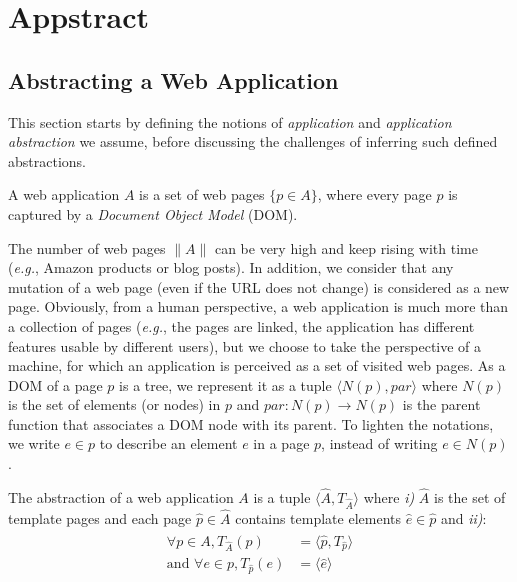 \section{Appstract}\label{appstract:sec:appstract}
\subsection{Abstracting a Web Application}
This section starts by defining the notions of \emph{application} and \emph{application abstraction} we assume, before discussing the challenges of inferring such defined abstractions.

\begin{defn}[\em Application]
A web application $A$ is a set of web pages $\{p \in A\}$, where every page $p$ is captured by a \emph{Document Object Model} (DOM).
\end{defn}

The number of web pages $\|A\|$ can be very high and keep rising with time (\emph{e.g.}, Amazon products or blog posts).
In addition, we consider that any mutation of a web page (even if the URL does not change) is considered as a new page.
Obviously, from a human perspective, a web application is much more than a collection of pages (\emph{e.g.}, the pages are linked, the application has different features usable by different users), but we choose to take the perspective of a machine, for which an application is perceived as a set of visited web pages.
% 
As a DOM of a page $p$ is a tree, we represent it as a tuple $\langle N(p), par \rangle$ where $N(p)$ is the set of elements (or nodes) in $p$ and $par: N(p) \to N(p)$ is the parent function that associates a DOM node with its parent.
To lighten the notations, we write $e \in p$ to describe an element $e$ in a page $p$, instead of writing $e \in N(p)$.

\begin{defn}
The abstraction of a web application $A$ is a tuple $\langle\hat{A}, T_{\hat{A}}\rangle$ where \emph{i)} $\hat{A}$ is the set of template pages and each page $\hat{p} \in \hat{A}$ contains template elements $\hat{e} \in \hat{p}$ and \emph{ii)}:
\begin{align}
  \label{eq:1}
  \begin{split}
    \forall p \in A, T_{\hat{A}}(p) & = \langle\hat{p}, T_{\hat{p}}\rangle \\
    \text{and } \forall e \in p, T_{\hat{p}}(e) & = \langle\hat{e}\rangle
  \end{split}
\end{align}\end{defn}


